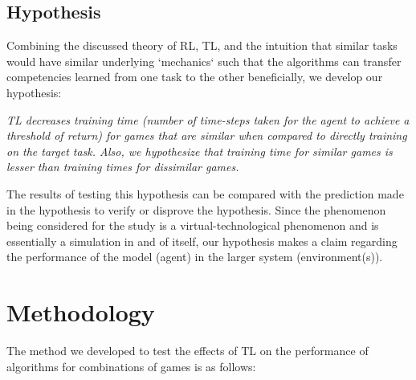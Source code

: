 \subsection*{Hypothesis}
Combining the discussed theory of RL, TL, and the intuition that similar tasks would have similar underlying `mechanics` such that the algorithms can transfer competencies learned from one task to the other beneficially, we develop our hypothesis:

\textit{TL decreases training time (number of time-steps taken for the agent to achieve a threshold of return) for games that are similar when compared to directly training on the target task. Also, we hypothesize that training time for similar games is lesser than training times for dissimilar games.}

The results of testing this hypothesis can be compared with the prediction made in the hypothesis to verify or disprove the hypothesis. Since the phenomenon being considered for the study is a virtual-technological phenomenon and is essentially a simulation in and of itself, our hypothesis makes a claim regarding the performance of the model (agent) in the larger system (environment(s)). 

\section{Methodology}
The method we developed to test the effects of TL on the performance of algorithms for combinations of games is as follows:
